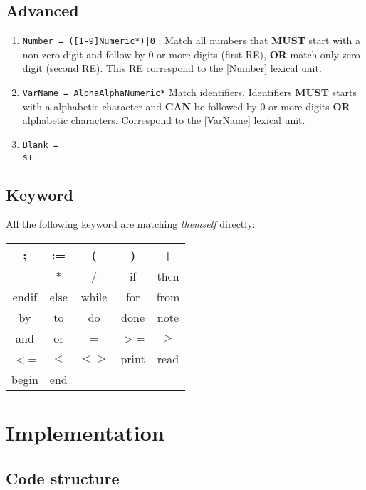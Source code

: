 \documentclass[letterpaper]{article}
\begin{document}
\subsection{Advanced}
\label{advanced-ere}
\begin{enumerate}
    \item \texttt{Number = ([1-9]{Numeric}*)|0} :
    Match all numbers that \textbf{MUST} start with a non-zero digit and follow
    by 0 or more digits (first RE),
    \textbf{OR} match only zero digit (second RE). This RE correspond to
    the [Number] lexical unit.
    \item \texttt{VarName = {Alpha}{AlphaNumeric}*}
    Match identifiers. Identifiers \textbf{MUST} starts with a alphabetic
    character and \textbf{CAN} be followed by 0 or more digits \textbf{OR}
    alphabetic characters.
    Correspond to the [VarName] lexical unit.
    \item \texttt{Blank = \\s+}
\end{enumerate}

\subsection{Keyword}

\label{ere-keywords}

All the following keyword are matching \textit{themself} directly: \\

\begin{tabular}{|c|c|c|c|c|}
    \hline
    ; & := & ( & )  & + \\
    \hline
    - & *  & / & if & then \\
    \hline
    endif & else & while & for & from \\
    \hline
    by & to & do & done & note \\
    \hline
    and & or & = & $>$= & $>$ \\
    \hline
    $<$= & $<$ & $<>$ & print & read \\
    \hline
    begin & end & & &  \\
    \hline
\end{tabular}



\section{Implementation}

\subsection{Code structure}
\end{document}
